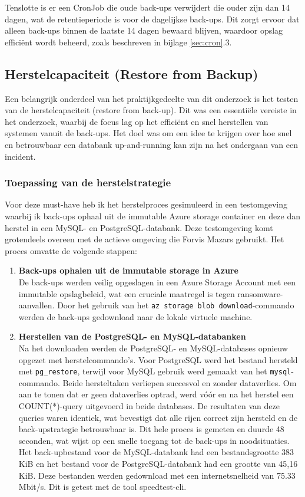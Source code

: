 Tenslotte is er een CronJob die oude back-ups verwijdert die ouder zijn dan 14 dagen, wat de retentieperiode is voor de dagelijkse back-ups. Dit zorgt ervoor dat alleen back-ups binnen de laatste 14 dagen bewaard blijven, waardoor opslag efficiënt wordt beheerd, zoals beschreven in bijlage \ref{sec:cron}.3.

\subsection{Herstelcapaciteit (Restore from Backup)}
Een belangrijk onderdeel van het praktijkgedeelte van dit onderzoek is het testen van de herstelcapaciteit (restore from back-up). Dit was een essentiële vereiste in het onderzoek, waarbij de focus lag op het efficiënt en snel herstellen van systemen vanuit de back-ups. Het doel was om een idee te krijgen over hoe snel en betrouwbaar een databank up-and-running kan zijn na het ondergaan van een incident.

\subsubsection{Toepassing van de herstelstrategie}
Voor deze must-have heb ik het herstelproces gesimuleerd in een testomgeving waarbij ik back-ups ophaal uit de immutable Azure storage container en deze dan herstel in een MySQL- en PostgreSQL-databank. Deze testomgeving komt grotendeels overeen met de actieve omgeving die Forvis Mazars gebruikt. Het proces omvatte de volgende stappen:

\begin{enumerate}
    \item \textbf{Back-ups ophalen uit de immutable storage in Azure} \\
    De back-ups werden veilig opgeslagen in een Azure Storage Account met een immutable opslagbeleid, wat een cruciale maatregel is tegen ransomware-aanvallen. Door het gebruik van het \texttt{az storage blob download}-commando werden de back-ups gedownload naar de lokale virtuele machine.
    
    \item \textbf{Herstellen van de PostgreSQL- en MySQL-databanken} \\
    Na het downloaden werden de PostgreSQL- en MySQL-databases opnieuw opgezet met herstelcommando’s. Voor PostgreSQL werd het bestand hersteld met \texttt{pg\_restore}, terwijl voor MySQL gebruik werd gemaakt van het \texttt{mysql}-commando. Beide hersteltaken verliepen succesvol en zonder dataverlies. Om aan te tonen dat er geen dataverlies optrad, werd vóór en na het herstel een COUNT(*)-query uitgevoerd in beide databases. De resultaten van deze queries waren identiek, wat bevestigt dat alle rijen correct zijn hersteld en de back-upstrategie betrouwbaar is. Dit hele proces is gemeten en duurde 48 seconden, wat wijst op een snelle toegang tot de back-ups in noodsituaties. Het back-upbestand voor de MySQL-databank had een bestandsgrootte 383 KiB en het bestand voor de PostgreSQL-databank had een grootte van 45,16 KiB. Deze bestanden werden gedownload met een internetsnelheid van 75.33 Mbit/s. Dit is getest met de tool speedtest-cli.
\end{enumerate}

